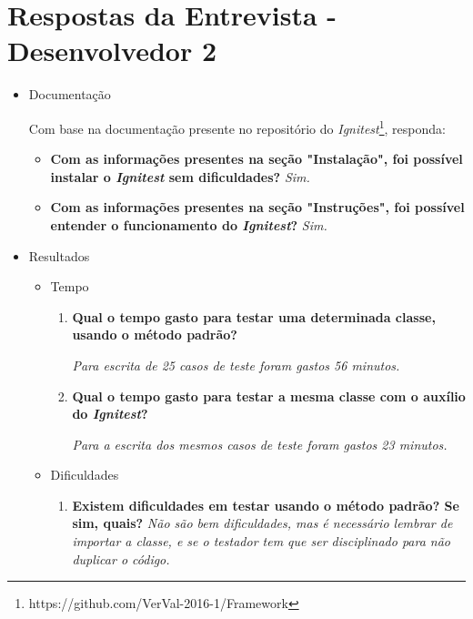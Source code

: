 \chapter{Respostas da Entrevista - Desenvolvedor 2}
    
    \begin{itemize}
        \item Documentação
        
            Com base na documentação presente no repositório do \textit{Ignitest}\footnote{https://github.com/VerVal-2016-1/Framework}, responda:
            \begin{itemize}
                \item \textbf{Com as informações presentes na seção "Instalação", foi possível instalar o \textit{Ignitest} sem dificuldades?}
                    \subitem \textit{Sim.}

                \item \textbf{Com as informações presentes na seção "Instruções", foi possível entender o funcionamento do \textit{Ignitest}?}
                    \subitem \textit{Sim.}
            \end{itemize}

        \item Resultados
            \begin{itemize}
                \item Tempo
                    \begin{enumerate}
                        \item \textbf{Qual o tempo gasto para testar uma determinada classe, usando o método padrão?}

                            \subitem \textit{Para escrita de 25 casos de teste foram gastos 56 minutos.}              
              
                        \item \textbf{Qual o tempo gasto para testar a mesma classe com o auxílio do \textit{Ignitest}?}
              
                            \subitem \textit{Para a escrita dos mesmos casos de teste foram gastos 23 minutos.}
                        
                    \end{enumerate}
                \item Dificuldades
                    \begin{enumerate}
                        \item \textbf{Existem dificuldades em testar usando o método padrão? Se sim, quais?}
                            \subitem \textit{Não são bem dificuldades, mas é necessário lembrar de importar a classe, e se o testador tem que ser disciplinado para não duplicar o código.}


\end{enumerate}
\end{itemize}
\end{itemize}

